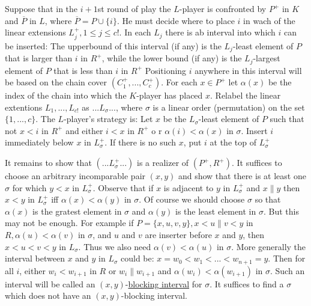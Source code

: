 \documentclass[twoside]{article}
\begin{document}
Suppose that in the $i+1$st round of play the $L$-player is confronted by $P^+$ in
$K$ and $\overline{P}$ in $L$, where $\overline{P} = P \cup \{i\}$. He must decide where to place $i$
in wach of the linear extensions $L^+_j, 1\leq j\leq c!$. In each $L_j$ there is ab
interval into which $i$ can be inserted: The upperbound of this interval (if any)
is the $L_j$-least element of $P$ that is larger than $i$ in $R^+$, while the lower
bound (if any) is the $L_j$-largest element of $P$ that is less than $i$ in $R^+$
Positioning $i$ anywhere in this interval will be based on the chain cover $(C^+_1,...,C^+_c)$.
For each $x \in P^+$ let $\alpha (x)$ be the index of the chain into which the $K$-player has
placed $x$. Relabel the linear extentions $L_1,...,L_{c!}$ as $...L_{\sigma}...$, where
$\sigma$ is a linear order (permutation) on the set $\{1,...,c\}$. The $L$-player's strategy
is: Let $x$ be the $L_{\sigma}$-least element of $P$ such that not $x<i$ in $R^+$ and either
$i<x$ in $R^+$ o r $\alpha (i) < \alpha (x)$ in $\sigma$. Insert $i$ immediately
below $x$ in $L^+_{\sigma}$. If there is no such $x$, put $i$ at the top of $L^+_{\sigma}$

It remains to show that $(...L^+_{\sigma}...)$ is a realizer of $(P^+,R^+)$. It
suffices to choose an arbitrary incomparable pair $(x,y)$ and show that there is 
at least one $\sigma$ for which $y<x$ in $L_{\sigma}^+$. Observe that if $x$ is adjacent to $y$ in $L^+_{\sigma}$
and $x \parallel y$ then $x<y$ in $L^+_{\sigma}$ iff $\alpha (x) < \alpha (y)$ in $\sigma$.
Of course we should choose $\sigma$ so that $\alpha (x)$ is the gratest element
in $\sigma$ and $\alpha (y)$ is the least element in $\sigma$. But this may not be 
enough. For example if $P =\{x,u,v,y\}, x<u\parallel v<y$ in $R, \alpha (u) < \alpha (v)$
in $\sigma$, and $u$ and $v$ are inserter before $x$ and $y$, then $x<u<v<y$ in $L_{\sigma}$.
Thus we also need $\alpha (v) < \alpha (u)$ in $\sigma$. More generally the interval between $x$
and $y$ in $L_{\sigma}$ could be: $x = w_0<w_1<...<w_{n+1} = y$. Then for all $i$, either
$w_i < w_{i+1}$ in $R$ or $w_i \parallel w_{i+1}$ and $\alpha (w_i) < \alpha (w_{i+1})$ in 
$\sigma$. Such an interval will be called an $(x,y)$-\underline{blocking interval} for $\sigma$.
It suffices to find a $\sigma$ which does not have an $(x,y)$-blocking interval.
\end{document}
